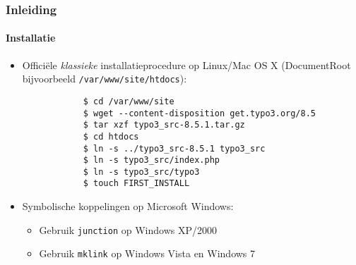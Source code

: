 \begin{frame}[fragile]
	\frametitle{Inleiding}
	\framesubtitle{Installatie}

	\begin{itemize}
		\item Officiële \textit{klassieke} installatieprocedure op Linux/Mac OS X\newline
			(DocumentRoot bijvoorbeeld \texttt{/var/www/site/htdocs}):
		\begin{lstlisting}
			$ cd /var/www/site
			$ wget --content-disposition get.typo3.org/8.5
			$ tar xzf typo3_src-8.5.1.tar.gz
			$ cd htdocs
			$ ln -s ../typo3_src-8.5.1 typo3_src
			$ ln -s typo3_src/index.php
			$ ln -s typo3_src/typo3
			$ touch FIRST_INSTALL
		\end{lstlisting}

		\item Symbolische koppelingen op Microsoft Windows:

			\begin{itemize}
				\item Gebruik \texttt{junction} op Windows XP/2000
				\item Gebruik \texttt{mklink} op Windows Vista en Windows 7
			\end{itemize}

	\end{itemize}
\end{frame}

